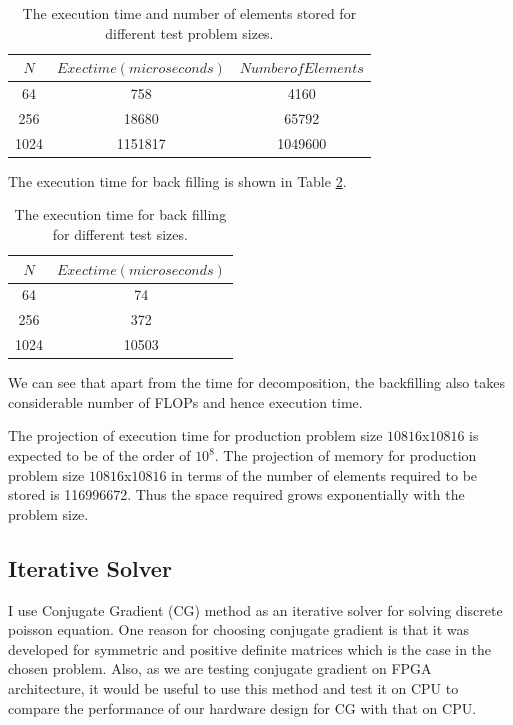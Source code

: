 \documentclass{article}
\begin{document}
\begin{spacing}{1.1}
\begin{table}[H]
\begin{center}
 \begin{tabular}{| c | c | c |} 
 \hline
$N$ & $Exec time (microseconds)$  & $Number of Elements$  \\ %
 \hline
64 & 758 & 4160\\ %
256 &  18680 & 65792\\ %
1024 &  1151817 & 1049600 \\ %
 \hline
\end{tabular}%
\end{center}
\caption{\label{exec_direct} The execution time and number of elements stored for different test problem sizes.  } 
\end{table}

The execution time for back filling is shown in Table \ref{backfill_direct}.

\begin{table}[H]
\begin{center}
 \begin{tabular}{| c | c |} 
 \hline
$N$ & $Exec time (microseconds)$ \\ %
 \hline
64 & 74  \\ %
256 &  372 \\ %
1024 &  10503  \\ %
 \hline
\end{tabular}%
\end{center}
\caption{\label{backfill_direct} The execution time for back filling for different test sizes.  } 
\end{table}

We can see that apart from the time for decomposition, the backfilling also takes considerable number of FLOPs and hence execution time. 

The projection of execution time for production problem size $10816$x$10816$ is expected to be of the order of $10^8$. The projection of memory for production problem size $10816$x$10816$ in terms of the number of elements required to be stored is 116996672. Thus the space required grows exponentially with the problem size.


\subsection{Iterative Solver}

I use Conjugate Gradient (CG) method as an iterative solver for solving discrete poisson equation. One reason for choosing conjugate gradient is that it was developed for symmetric and positive definite matrices which is the case in the chosen problem. Also, as we are testing conjugate gradient on FPGA architecture, it would be useful to use this method and test it on CPU to compare the performance of our hardware design for CG with that on CPU.


\end{spacing}
\end{document}
